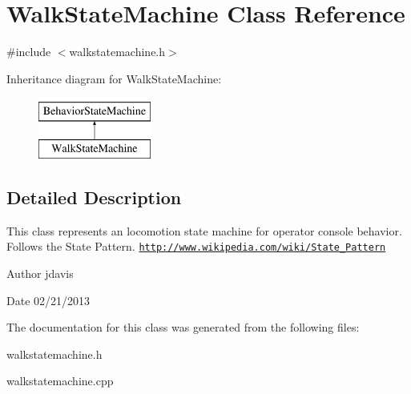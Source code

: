 \hypertarget{classWalkStateMachine}{\section{Walk\-State\-Machine Class Reference}
\label{classWalkStateMachine}
}


{\ttfamily \#include $<$walkstatemachine.\-h$>$}

Inheritance diagram for Walk\-State\-Machine\-:\begin{figure}[H]
\begin{center}
\leavevmode
\includegraphics[height=2.000000cm]{classWalkStateMachine}
\end{center}
\end{figure}


\subsection{Detailed Description}
This class represents an locomotion state machine for operator console behavior. Follows the State Pattern. \href{http://www.wikipedia.com/wiki/State_Pattern}{\tt http\-://www.\-wikipedia.\-com/wiki/\-State\-\_\-\-Pattern}

\begin{DoxyAuthor}{Author}
jdavis 
\end{DoxyAuthor}
\begin{DoxyDate}{Date}
02/21/2013 
\end{DoxyDate}


The documentation for this class was generated from the following files\-:\begin{DoxyCompactItemize}
\item 
walkstatemachine.\-h\item 
walkstatemachine.\-cpp\end{DoxyCompactItemize}
